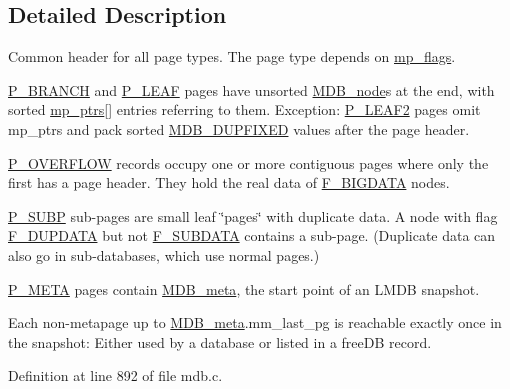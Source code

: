 \subsection{Detailed Description}
Common header for all page types. The page type depends on \mbox{\hyperlink{struct_m_d_b__page_a851621a8c9f179faf4bdb82eb3b65e1e}{mp\+\_\+flags}}.

\mbox{\hyperlink{group__mdb__page_gad6639bfcad26dbcbf7970dfa28f1a930}{P\+\_\+\+B\+R\+A\+N\+CH}} and \mbox{\hyperlink{group__mdb__page_gac85fb59a9a2eda0d33e58b23a7ca019a}{P\+\_\+\+L\+E\+AF}} pages have unsorted \textquotesingle{}\mbox{\hyperlink{struct_m_d_b__node}{M\+D\+B\+\_\+node}}\textquotesingle{}s at the end, with sorted \mbox{\hyperlink{struct_m_d_b__page_ae0e2d177c6a934322ef3736875d70caf}{mp\+\_\+ptrs}}\mbox{[}\mbox{]} entries referring to them. Exception\+: \mbox{\hyperlink{group__mdb__page_ga9c80486a549b2efbd5561cdd4df238c4}{P\+\_\+\+L\+E\+A\+F2}} pages omit mp\+\_\+ptrs and pack sorted \mbox{\hyperlink{group__mdb__dbi__open_ga5acc26f80668d1ebc31265d178c69338}{M\+D\+B\+\_\+\+D\+U\+P\+F\+I\+X\+ED}} values after the page header.

\mbox{\hyperlink{group__mdb__page_ga15141fe5d59efdf035bf8862250c25d7}{P\+\_\+\+O\+V\+E\+R\+F\+L\+OW}} records occupy one or more contiguous pages where only the first has a page header. They hold the real data of \mbox{\hyperlink{group__mdb__node_gafbd60c1d77d9343d044d0792754e42f0}{F\+\_\+\+B\+I\+G\+D\+A\+TA}} nodes.

\mbox{\hyperlink{group__mdb__page_ga77cc6dc98fda40c81fb2f75068fb5551}{P\+\_\+\+S\+U\+BP}} sub-\/pages are small leaf \char`\"{}pages\char`\"{} with duplicate data. A node with flag \mbox{\hyperlink{group__mdb__node_ga6e93fc5b62c03a0b85d0755b7d19bee5}{F\+\_\+\+D\+U\+P\+D\+A\+TA}} but not \mbox{\hyperlink{group__mdb__node_ga5323896692f7418870f72d7a5f1b2bab}{F\+\_\+\+S\+U\+B\+D\+A\+TA}} contains a sub-\/page. (Duplicate data can also go in sub-\/databases, which use normal pages.)

\mbox{\hyperlink{group__mdb__page_ga3d5d5c4af2527d4d9230d414230580ac}{P\+\_\+\+M\+E\+TA}} pages contain \mbox{\hyperlink{struct_m_d_b__meta}{M\+D\+B\+\_\+meta}}, the start point of an L\+M\+DB snapshot.

Each non-\/metapage up to \mbox{\hyperlink{struct_m_d_b__meta}{M\+D\+B\+\_\+meta}}.mm\+\_\+last\+\_\+pg is reachable exactly once in the snapshot\+: Either used by a database or listed in a free\+DB record. 

Definition at line 892 of file mdb.\+c.



